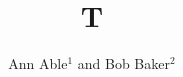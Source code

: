 \documentclass{amsart}
\begin{document}
\title{T}
\author{Ann Able$^{1}$ and Bob Baker$^{2}$}
\address{$^1$Univ A}
\address{$^2$Univ B}
\maketitle
\end{document}
